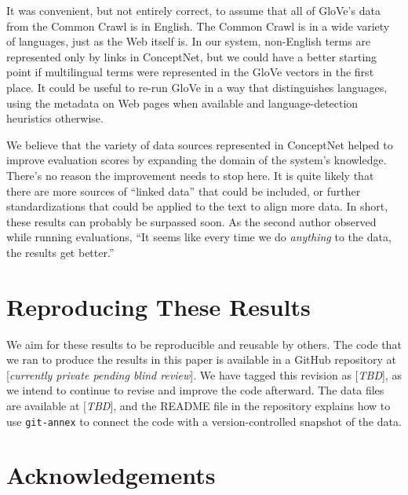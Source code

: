 \documentclass[11pt,letterpaper]{article}
\begin{document}
It was convenient, but not entirely correct, to assume that all of GloVe's data
from the Common Crawl is in English. The Common Crawl is in a wide variety of
languages, just as the Web itself is. In our system, non-English terms are
represented only by links in ConceptNet, but we could have a better starting
point if multilingual terms were represented in the GloVe vectors in the first
place. It could be useful to re-run GloVe in a way that distinguishes languages,
using the metadata on Web pages when available and language-detection heuristics
otherwise.

We believe that the variety of data sources represented in ConceptNet helped to
improve evaluation scores by expanding the domain of the system's knowledge.
There's no reason the improvement needs to stop here. It is quite likely that
there are more sources of ``linked data'' that could be included, or further
standardizations that could be applied to the text to align more data. In
short, these results can probably be surpassed soon. As the second author
observed while running evaluations, ``It seems like every time we do {\em
anything} to the data, the results get better.''

\section{Reproducing These Results}

We aim for these results to be reproducible and reusable by others. The code
that we ran to produce the results in this paper is available in a GitHub
repository at [{\em currently private pending blind review}]. We have tagged
this revision as [{\em TBD}], as we intend to continue to revise and improve the
code afterward. The data files are available at [{\em TBD}], and the README file
in the repository explains how to use {\tt git-annex} to connect the code
with a version-controlled snapshot of the data.

\section*{Acknowledgements}

\begin{CJK*}{UTF8}{min}

\end{CJK*}
\end{document}
